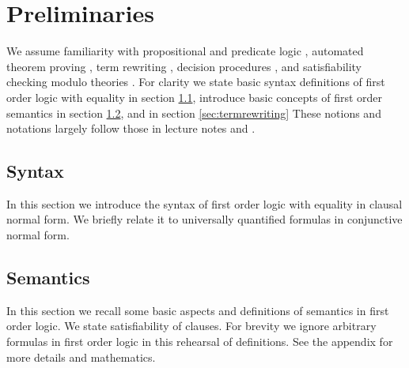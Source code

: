
\chapter{Preliminaries}



We assume familiarity with propositional and predicate logic \cite{Huth:2004:LCS:975331}, 
automated theorem proving \cite{Fitting:1996:FLA:230183}, 
term rewriting \cite{Baader:1998:TR:280474}, 
decision procedures \cite{Kroening:2008:DPA:1391237}, 
and satisfiability checking modulo theories \cite{Biere:2009:HSV:1550723}.
For clarity we state basic syntax definitions of first order logic with equality in section \ref{sec:syntax},
introduce basic concepts of first order semantics in section \ref{sec:semantics},
and in section \ref{sec:termrewriting} 
These notions and notations largely follow those in lecture notes \cite{AM2015tr} and \cite{GM2013ar}.


\section{Syntax}\label{sec:syntax}

In this section we introduce the syntax of first order logic with equality in clausal normal form.
We briefly relate it to universally quantified formulas in conjunctive normal form.

















\section{Semantics}\label{sec:semantics}

In this section we recall some basic aspects and definitions of semantics in first order logic. 
We state satisfiability of clauses. For brevity we ignore arbitrary formulas in first order logic
in this rehearsal of definitions. See the appendix for more details and mathematics.

